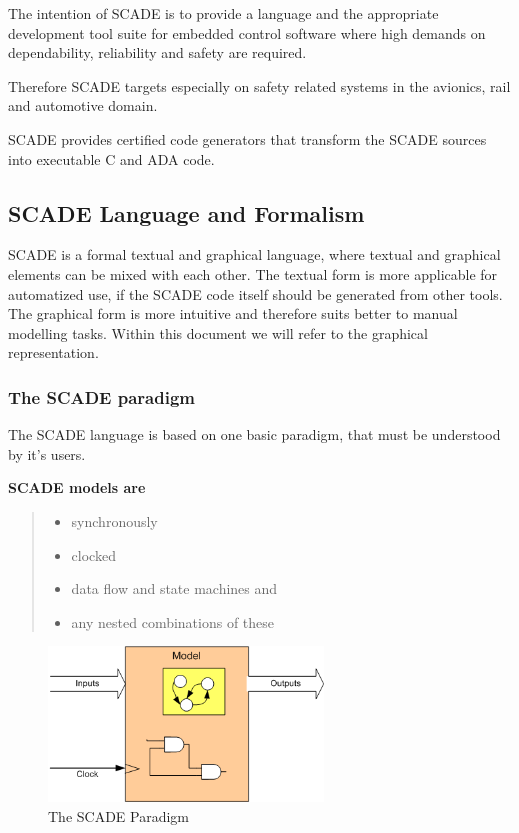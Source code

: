 \documentclass{template/openetcs_article}
\begin{document}
The intention of SCADE is to provide a language and the appropriate development tool suite for embedded control software where high demands on dependability, reliability and safety are required. 

Therefore SCADE targets especially on safety related systems in the avionics, rail and automotive domain. 

SCADE provides certified code generators that transform the SCADE sources into executable C and ADA code. 


\subsection{SCADE Language and Formalism}
\label{sec:SCADELanguageAndFormalism}

SCADE is a formal textual and graphical language, where textual and graphical elements can be mixed with each other. The textual form is more applicable for automatized use, if the SCADE code itself should be generated from other tools. The graphical form is more intuitive and therefore suits better to manual modelling tasks. Within this document we will refer to the graphical representation. 

\subsubsection{The SCADE paradigm}
\label{sec:TheSCADEParadigm}

The SCADE language is based on one basic paradigm, that must be understood by it's users. 

\textbf{SCADE models are} 
\begin{quote}
\begin{itemize}

	\item synchronously
	\item clocked
	\item data flow and state machines and
	\item any nested combinations of these
	
\end{itemize}
\end{quote}


\begin{figure}[htbp]
	\centering
		\includegraphics[width=0.65\textwidth]{SCADE_Paradigm.png}
	\caption{The SCADE Paradigm}
	\label{fig:SCADE_Paradigm}
\end{figure}
\end{document}
